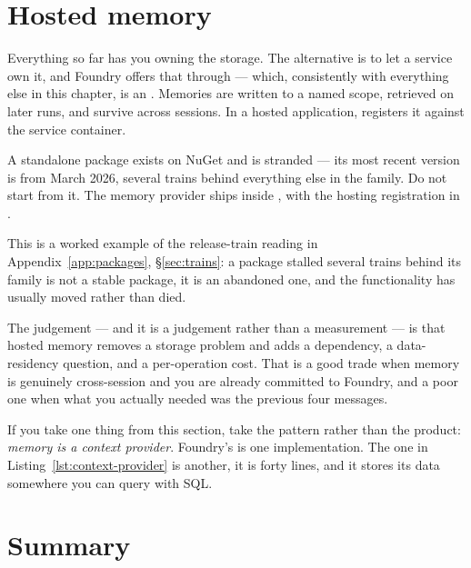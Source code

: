 \section{Hosted memory}
\label{sec:foundry-memory}

Everything so far has you owning the storage. The alternative is to let a service
own it, and Foundry offers that through  --- which,
consistently with everything else in this chapter, is an .
Memories are written to a named scope, retrieved on later runs, and survive
across sessions. In a hosted application,
 registers it against the service container.

\begin{versionbox}
A standalone  package exists on NuGet and
is stranded --- its most recent version is from March 2026, several trains behind
everything else in the family. Do not start from it. The memory provider ships
inside , with the hosting registration in
.

This is a worked example of the release-train reading in
Appendix~\ref{app:packages}, \S\ref{sec:trains}: a package stalled several trains
behind its family is not a stable package, it is an abandoned one, and the
functionality has usually moved rather than died.
\end{versionbox}

The judgement --- and it is a judgement rather than a measurement --- is that
hosted memory removes a storage problem and adds a dependency, a data-residency
question, and a per-operation cost. That is a good trade when memory is genuinely
cross-session and you are already committed to Foundry, and a poor one when what
you actually needed was the previous four messages.

If you take one thing from this section, take the pattern rather than the
product: \emph{memory is a context provider}. Foundry's is one implementation.
The one in Listing~\ref{lst:context-provider} is another, it is forty lines, and
it stores its data somewhere you can query with SQL.

\section{Summary}

